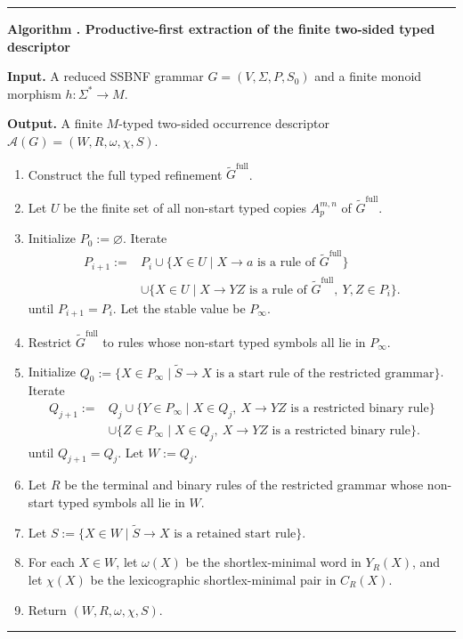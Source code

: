 \documentclass[sub]{jalc}
\newcommand{\Gfull}{\widetilde G^{\mathrm{full}}}
\newcounter{algbox}
\newenvironment{algobox}[1]{%
\refstepcounter{algbox}%
\begin{center}%
\begin{minipage}{0.96\linewidth}%
\hrule\vspace{0.5em}%
\noindent\textbf{Algorithm \thealgbox. #1}\par\smallskip%
}{%
\vspace{0.3em}\hrule%
\end{minipage}%
\end{center}%
}
\begin{document}
\begin{algobox}{Productive-first extraction of the finite two-sided typed descriptor}
\label{alg:productive-first-extraction}
\noindent\textbf{Input.} A reduced SSBNF grammar \(G=(V,\Sigma,P,S_0)\) and a finite monoid morphism \(h:\Sigma^*\to M\).

\smallskip
\noindent\textbf{Output.} A finite \(M\)-typed two-sided occurrence descriptor \(\mathcal A(G)=(W,R,\omega,\chi,S)\).

\begin{enumerate}[label=\textup{\arabic*.},leftmargin=2.2em]
\item Construct the full typed refinement \(\Gfull\).
\item Let \(U\) be the finite set of all non-start typed copies \(A_p^{m,n}\) of \(\Gfull\).
\item Initialize \(P_0:=\varnothing\). Iterate
\[
\begin{aligned}
P_{i+1}:={}&P_i
\cup\{X\in U\mid X\to a\text{ is a rule of }\Gfull\}\\
&\cup\{X\in U\mid X\to YZ\text{ is a rule of }\Gfull,\ Y,Z\in P_i\}.
\end{aligned}
\]
until \(P_{i+1}=P_i\). Let the stable value be \(P_\infty\).
\item Restrict \(\Gfull\) to rules whose non-start typed symbols all lie in \(P_\infty\).
\item Initialize \(Q_0:=\{X\in P_\infty\mid \widetilde S\to X\text{ is a start rule of the restricted grammar}\}\). Iterate
\[
\begin{aligned}
Q_{j+1}:={}&Q_j
\cup\{Y\in P_\infty\mid X\in Q_j,\ X\to YZ\text{ is a restricted binary rule}\}\\
&\cup\{Z\in P_\infty\mid X\in Q_j,\ X\to YZ\text{ is a restricted binary rule}\}.
\end{aligned}
\]
until \(Q_{j+1}=Q_j\). Let \(W:=Q_j\).
\item Let \(R\) be the terminal and binary rules of the restricted grammar whose non-start typed symbols all lie in \(W\).
\item Let \(S:=\{X\in W\mid \widetilde S\to X\text{ is a retained start rule}\}\).
\item For each \(X\in W\), let \(\omega(X)\) be the shortlex-minimal word in \(Y_R(X)\), and let \(\chi(X)\) be the lexicographic shortlex-minimal pair in \(C_R(X)\).
\item Return \((W,R,\omega,\chi,S)\).
\end{enumerate}
\end{algobox}
\end{document}
